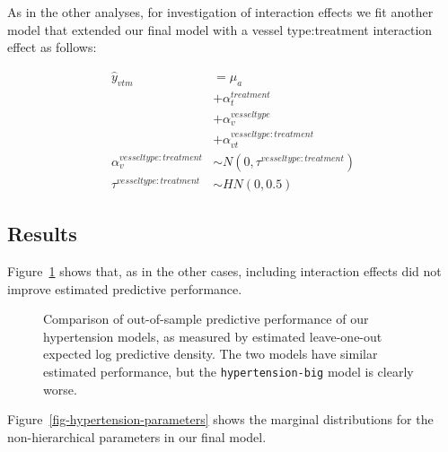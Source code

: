 \documentclass[
  letterpaper,
  DIV=11,
  numbers=noendperiod,
  oneside]{scrartcl}
\theoremstyle{plain}
\theoremstyle{remark}
\begin{document}
As in the other analyses, for investigation of interaction effects we
fit another model that extended our final model with a vessel
type:treatment interaction effect as follows:

\begin{align}
\hat{y}_{vtm} &= \mu_a \nonumber \\
  &+ \alpha^{treatment}_{t} \nonumber \\
  &+ \alpha^{vesseltype}_{v} \nonumber \\
  &+ \alpha^{vesseltype:treatment}_{vt} \nonumber \\
\alpha^{vesseltype:treatment}_v &\sim N(0, \tau^{vesseltype:treatment}) \nonumber \\
\tau^{vesseltype:treatment} &\sim HN(0, 0.5) \nonumber
\end{align}

\subsection{Results}\label{results-3}

Figure~\ref{fig-hypertension-loo} shows that, as in the other cases,
including interaction effects did not improve estimated predictive
performance.

\begin{figure}


\caption{\label{fig-hypertension-loo}Comparison of out-of-sample
predictive performance of our hypertension models, as measured by
estimated leave-one-out expected log predictive density. The two models
have similar estimated performance, but the \texttt{hypertension-big}
model is clearly worse.}

\end{figure}%

Figure~\ref{fig-hypertension-parameters} shows the marginal
distributions for the non-hierarchical parameters in our final model.
\end{document}
